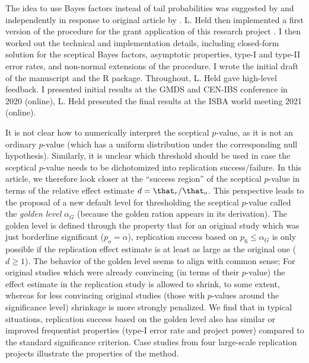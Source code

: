 The idea to use Bayes factors instead of tail probabilities was suggested by
\citet{Consonni2019} and \citet{Pericchi2020} independently in response to
original article by \citet{Held2020}. L. Held then implemented a first version
of the procedure for the grant application of this research project
\citep{Heldproposal2019}. I then worked out the technical and implementation
details, including closed-form solution for the sceptical Bayes factors,
asymptotic properties, type-I and type-II error rates, and non-normal extensions
of the procedure. I wrote the initial draft of the manuscript and the R package.
Throughout, L. Held gave high-level feedback. I presented initial results at the
GMDS and CEN-IBS conference in 2020 (online), L. Held presented the final
results at the ISBA world meeting 2021 (online).


It is not clear how to numerically interpret the sceptical $p$-value, as it is
not an ordinary $p$-value (which has a uniform distribution under the
corresponding null hypothesis). Similarly, it is unclear which threshold should
be used in case the sceptical $p$-value needs to be dichotomized into
replication success/failure. In this article, we therefore look closer at the
``success region'' of the sceptical $p$-value in terms of the relative effect
estimate $d = \that_{r}/\that_{o}$. This perspective leads to the proposal of a
new default level for thresholding the sceptical $p$-value called the
\emph{golden level} $\alpha_{G}$ (because the golden ration appears in its
derivation). The golden level is defined through the property that for an
original study which was just borderline significant ($p_{o} = \alpha$),
replication success based on $p_{\text{S}} \leq \alpha_{G}$ is only possible if
the replication effect estimate is at least as large as the original one
($d \geq 1$). The behavior of the golden level seems to align with common sense;
For original studies which were already convincing (in terms of their $p$-value)
the effect estimate in the replication study is allowed to shrink, to some
extent, whereas for less convincing original studies (those with $p$-values
around the significance level) shrinkage is more strongly penalized. We find
that in typical situations, replication success based on the golden level also
has similar or improved frequentist properties (type-I error rate and project
power) compared to the standard significance criterion. Case studies from four
large-scale replication projects illustrate the properties of the method.

